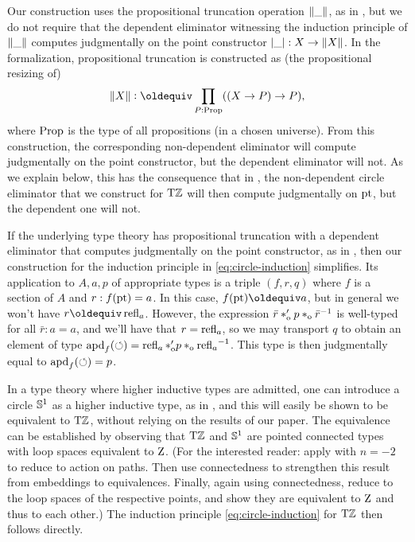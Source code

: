 \documentclass[a4paper,12pt]{amsart}
\begin{document}
Our construction uses the propositional truncation operation $\lVert\_\rVert$,
as in \cite[6.9]{hottbook},
but we do not require that the dependent eliminator
witnessing the induction principle of $\lVert\_\rVert$
computes judgmentally on the point constructor $\lvert\_\rvert: X \to \lVert X\rVert$.
In the \UniMath{} formalization, propositional truncation is constructed as
(the propositional resizing of)
\begin{equation}\label{eq:trunc-impred}
  \Trunc X \defeq \prod_{P:\Prop}((X \to P) \to P),
\end{equation}
where $\mathord{\mathrm{Prop}}$ is the type of all propositions (in a chosen universe).
From this construction, the corresponding non-dependent eliminator
will compute judgmentally on the point constructor,
but the dependent eliminator will not.
As we explain below, this has the consequence that
in \UniMath{}, the non-dependent circle eliminator that we construct for ${\mathrm{T}\mathbb{Z}}$
will then compute judgmentally on ${\mathord{\mathrm{pt}}}$,
but the dependent one will not.

If the underlying type theory has propositional truncation with a dependent eliminator
that computes judgmentally on the point constructor, as in \cite[6.9]{hottbook},
then our construction for the induction principle in \cref{eq:circle-induction} simplifies.
Its application to $A,a,p$ of appropriate types
is a triple $(f,r,q)$ where $f$ is a section of $A$ and $r : f({\mathord{\mathrm{pt}}})= a$.
In this case, $f(\pt)\jdeq a$, but in general we won't have $r \jdeq \refl{a}$.
However, the expression $\bar r*_{\mathrm{o}}' p *_{\mathrm{o}} \bar r^{-1}$ is well-typed
for all $\bar r : a=a$, and we'll have that $r = \mathop{{\mathrm{refl}}_{a}}$,
so we may transport $q$ to obtain an element of type
$\mathop{{\mathrm{apd}}_{f}}({\circlearrowleft}) = \mathop{{\mathrm{refl}}_{a}} *_{\mathrm{o}}' p *_{\mathrm{o}} \mathop{{\mathrm{refl}}_{a}}^{-1}$.
This type is then judgmentally equal to $\mathop{{\mathrm{apd}}_{f}}({\circlearrowleft})=p$.

In a type theory where higher inductive types are admitted,
one can introduce a circle ${\mathbb{S}^1}$ as a higher inductive type,
as in \cite[6.1]{hottbook},
and this will easily be shown to be equivalent to ${\mathrm{T}\mathbb{Z}}$,
without relying on the results of our paper.
The equivalence can be established by observing that ${\mathrm{T}\mathbb{Z}}$ and ${\mathbb{S}^1}$
are pointed connected types with loop spaces equivalent to $\mathrm{Z}$.
(For the interested reader: apply \cite[Lemma 7.6.2]{hottbook} with $n=-2$
to reduce to action on paths. Then use connectedness to strengthen
this result from embeddings to equivalences.
Finally, again using connectedness, reduce to the loop spaces
of the respective points, and show they are equivalent to $\mathrm{Z}$ and thus to each other.)
The induction principle \cref{eq:circle-induction} for ${\mathrm{T}\mathbb{Z}}$ then follows directly.
\end{document}
